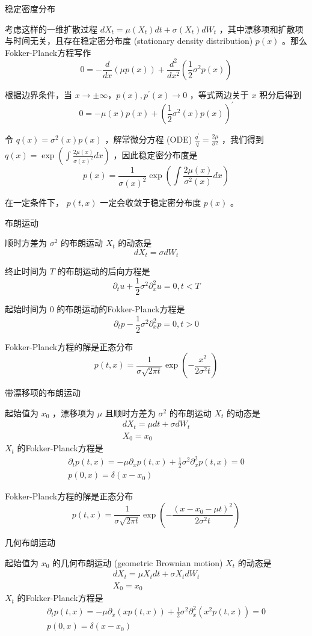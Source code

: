 \documentclass[lang=cn,newtx,10pt,scheme=chinese]{elegantbook}
\begin{document}
稳定密度分布

考虑这样的一维扩散过程 $d X_t=\mu\left(X_t\right) d t+\sigma\left(X_t\right) d W_t$ ，其中漂移项和扩散项与时间无关，且存在稳定密分布度 (stationary density distribution) $p(x)$ 。那么Fokker-Planck方程写作
$$
0=-\frac{d}{d x}(\mu p(x))+\frac{d^2}{d x^2}\left(\frac{1}{2} \sigma^2 p(x)\right)
$$

根据边界条件，当 $x \rightarrow \pm \infty ， p(x), p^{\prime}(x) \rightarrow 0$ ，等式两边关于 $x$ 积分后得到
$$
0=-\mu(x) p(x)+\left(\frac{1}{2} \sigma^2(x) p(x)\right)^{\prime}
$$

令 $q(x)=\sigma^2(x) p(x)$ ，解常微分方程 (ODE) $\frac{q^{\prime}}{q}=\frac{2 \mu}{\sigma^2}$ ，我们得到 $q(x)=\exp \left(\int \frac{2 \mu(x)}{\sigma(x)^2} d x\right)$ ，因此稳定密分布度是
$$
p(x)=\frac{1}{\sigma(x)^2} \exp \left(\int \frac{2 \mu(x)}{\sigma^2(x)} d x\right)
$$

在一定条件下， $p(t, x)$ 一定会收敛于稳定密分布度 $p(x)$ 。

布朗运动

顺时方差为 $\sigma^2$ 的布朗运动 $X_t$ 的动态是
$$
d X_t=\sigma d W_t
$$

终止时间为 $T$ 的布朗运动的后向方程是
$$
\partial_t u+\frac{1}{2} \sigma^2 \partial_x^2 u=0, t<T
$$

起始时间为 0 的布朗运动的Fokker-Planck方程是
$$
\partial_t p-\frac{1}{2} \sigma^2 \partial_x^2 p=0, t>0
$$

Fokker-Planck方程的解是正态分布
$$
p(t, x)=\frac{1}{\sigma \sqrt{2 \pi t}} \exp \left(-\frac{x^2}{2 \sigma^2 t}\right)
$$

带漂移项的布朗运动

起始值为 $x_0$ ，漂移项为 $\mu$ 且顺时方差为 $\sigma^2$ 的布朗运动 $X_t$ 的动态是
$$
\begin{gathered}
d X_t=\mu d t+\sigma d W_t \\
X_0=x_0
\end{gathered}
$$
$X_t$ 的Fokker-Planck方程是
$$
\begin{gathered}
\partial_t p(t, x)=-\mu \partial_x p(t, x)+\frac{1}{2} \sigma^2 \partial_x^2 p(t, x)=0 \\
p(0, x)=\delta\left(x-x_0\right)
\end{gathered}
$$

Fokker-Planck方程的解是正态分布
$$
p(t, x)=\frac{1}{\sigma \sqrt{2 \pi t}} \exp \left(-\frac{\left(x-x_0-\mu t\right)^2}{2 \sigma^2 t}\right)
$$

几何布朗运动

起始值为 $x_0$ 的几何布朗运动 (geometric Brownian motion) $X_t$ 的动态是
$$
\begin{gathered}
d X_t=\mu X_t d t+\sigma X_t d W_t \\
X_0=x_0
\end{gathered}
$$
$X_t$ 的Fokker-Planck方程是
$$
\begin{gathered}
\partial_t p(t, x)=-\mu \partial_x(x p(t, x))+\frac{1}{2} \sigma^2 \partial_x^2\left(x^2 p(t, x)\right)=0 \\
p(0, x)=\delta\left(x-x_0\right)
\end{gathered}
$$
\end{document}

